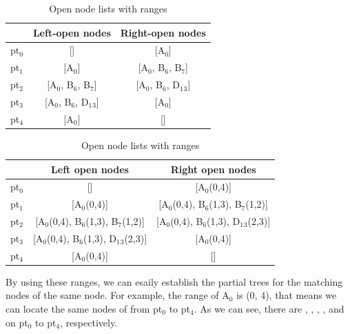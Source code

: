 {
\begin{table}[t]
		\caption{All open nodes}
	\label{table:allopennodes}
	\centering
	\begin{tabular}{c|cc}
		\hline
		& Left-open nodes	& Right-open nodes \\
		\hline
		pt$_0$	& []						& [A$_0$] \\
		pt$_1$	& [A$_0$]					& [A$_0$, B$_6$, B$_7$] \\
		pt$_2$	& [A$_0$, B$_6$, B$_7$]		& [A$_0$, B$_6$, D$_1$$_3$] \\
		pt$_3$	& [A$_0$, B$_6$, D$_1$$_3$]	& [A$_0$] \\
		pt$_4$	& [A$_0$]					& [] \\
		\hline
	\end{tabular}

	\caption{Open node lists with ranges}
	\label{table:rangesresult}
	\centering
	\begin{tabular}{c|cc}
		\hline
		& Left open nodes	& Right open nodes \\
		\hline
		pt$_0$	& []	& [A$_0$(0,4)] \\
		pt$_1$	& [A$_0$(0,4)]	& [A$_0$(0,4), B$_6$(1,3), B$_7$(1,2)] \\
		pt$_2$	& [A$_0$(0,4), B$_6$(1,3), B$_7$(1,2)]	& [A$_0$(0,4), B$_6$(1,3), D$_1$$_3$(2,3)] \\
		pt$_3$	& [A$_0$(0,4), B$_6$(1,3), D$_1$$_3$(2,3)]	& [A$_0$(0,4)] \\
		pt$_4$	& [A$_0$(0,4)]	& [] \\
		\hline
	\end{tabular}
\end{table}
}

By using these ranges, we can esaily establish the partial trees for the
matching nodes of the same node. For example, the range of A$_0$ is (0, 4), that
means we can locate the same nodes of  from pt$_0$ to pt$_4$. As we can
see, there are , , , , and  on
pt$_0$ to pt$_4$, respectively.
